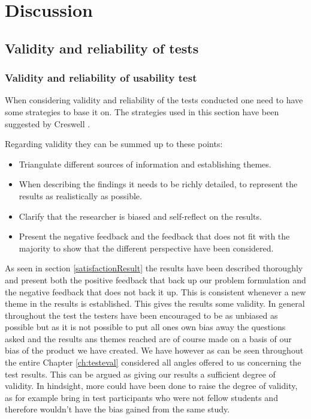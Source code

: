 \chapter{Discussion}\label{ch:discussion}

\section{Validity and reliability of tests}

\subsection{Validity and reliability of usability test}
When considering validity and reliability of the tests conducted one need to have some strategies to base it on. The strategies used in this section have been suggested by Creswell \citep{Creswell}.

Regarding validity they can be summed up to these points:
\begin{itemize}
\item Triangulate different sources of information and establishing themes.
\item When describing the findings it needs to be richly detailed, to represent the results as realistically as possible.
\item Clarify that the researcher is biased and self-reflect on the results.
\item Present the negative feedback and the feedback that does not fit with the majority to show that the different perspective have been considered.
\end{itemize}

As seen in section \ref{satisfactionResult} the results have been described thoroughly and present both the positive feedback that back up our problem formulation and the negative feedback that does not back it up. This is consistent whenever a new theme in the results is established. This gives the results some validity. In general throughout the test the testers have been encouraged to be as unbiased as possible but as it is not possible to put all ones own bias away the questions asked and the results ans themes reached are of course made on a basis of our bias of the product we have created. We have however as can be seen throughout the entire Chapter \ref{ch:testeval} considered all angles offered to us concerning the test results. This can be argued as giving our results a sufficient degree of validity. In hindsight, more could have been done to raise the degree of validity, as for example bring in test participants who were not fellow students and therefore wouldn't have the bias gained from the same study. 


